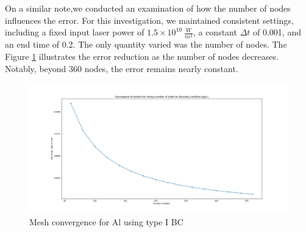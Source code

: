 On a similar note,we conducted an examination of how the number of nodes influences the error. For this investigation, we maintained consistent settings, including a fixed input laser power of $1.5 \times 10^{10} \ \frac{W}{m^2}$, a constant $\Delta t$ of 0.001, and an end time of 0.2.  The only quantity varied was the number of nodes. The Figure \ref{fig:meshconvergence_Al} illustrates the error reduction as the number of nodes decreases. Notably, beyond 360 nodes, the error remains nearly constant.
\begin{figure}[h]
  \centering
  \includegraphics[width=15cm]{img/Nodal_convergence.png}
  \caption{Mesh convergence for Al using type I BC}
  \label{fig:meshconvergence_Al}
\end{figure}
\newpage
